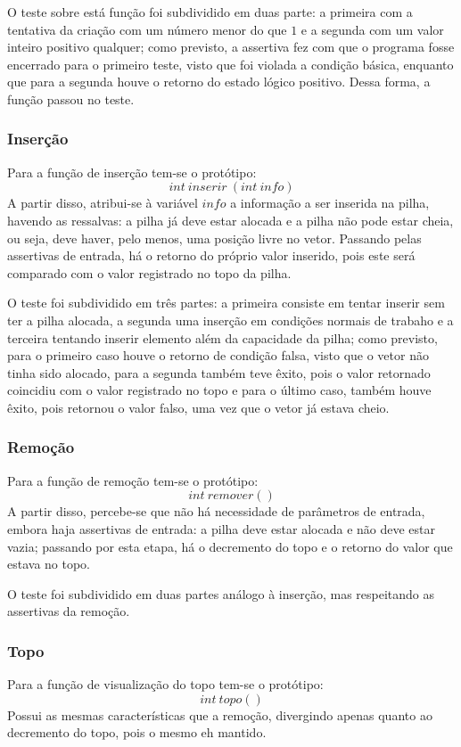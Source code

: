 \documentclass[conference]{Trabalho_1}
\begin{document}
O teste sobre est\'a fun\c{c}\~ao foi subdividido em duas parte: a primeira com a tentativa da cria\c{c}\~ao com um n\'umero menor do que $1$ e a segunda com um valor inteiro positivo qualquer; como previsto, a assertiva fez com que o programa fosse encerrado para o primeiro teste, visto que foi violada a condi\c{c}\~ao b\'asica, enquanto que para a segunda houve o retorno do estado l\'ogico positivo. Dessa forma, a fun\c{c}\~ao passou no teste.

\subsubsection{Inser\c{c}\~ao}
Para a fun\c{c}\~ao de inser\c{c}\~ao tem-se o prot\'otipo:
$$int\ inserir\ (int\ info)$$
A partir disso, atribui-se \`a vari\'avel $info$ a informa\c{c}\~ao a ser inserida na pilha, havendo as ressalvas: a pilha j\'a deve estar alocada e a pilha n\~ao pode estar cheia, ou seja, deve haver, pelo menos, uma posi\c{c}\~ao livre no vetor. Passando pelas assertivas de entrada, h\'a o retorno do pr\'oprio valor inserido, pois este ser\'a comparado com o valor registrado no topo da pilha.

O teste foi subdividido em tr\^es partes: a primeira consiste em tentar inserir sem ter a pilha alocada, a segunda uma inser\c{c}\~ao em condi\c{c}\~oes normais de trabaho e a terceira tentando inserir elemento al\'em da capacidade da pilha; como previsto, para o primeiro caso houve o retorno de condi\c{c}\~ao falsa, visto que o vetor n\~ao tinha sido alocado, para a segunda tamb\'em teve \^exito, pois o valor retornado coincidiu com o valor registrado no topo e para o \'ultimo caso, tamb\'em houve \^exito, pois retornou o valor falso, uma vez que o vetor j\'a estava cheio.

\subsubsection{Remo\c{c}\~ao}
Para a fun\c{c}\~ao de remo\c{c}\~ao tem-se o prot\'otipo:
$$int\ remover ()$$
A partir disso, percebe-se que n\~ao h\'a necessidade de par\^ametros de entrada, embora haja assertivas de entrada: a pilha deve estar alocada e n\~ao deve estar vazia; passando por esta etapa, h\'a o decremento do topo
e o retorno do valor que estava no topo.

O teste foi subdividido em duas partes an\'alogo \`a inser\c{c}\~ao, mas respeitando as assertivas da remo\c{c}\~ao.

\subsubsection{Topo}
Para a fun\c{c}\~ao de visualiza\c{c}\~ao do topo tem-se o prot\'otipo:
$$int\ topo ()$$
Possui as mesmas caracter\'isticas que a remo\c{c}\~ao, divergindo apenas quanto ao decremento do topo, pois o mesmo eh mantido.
\end{document}
